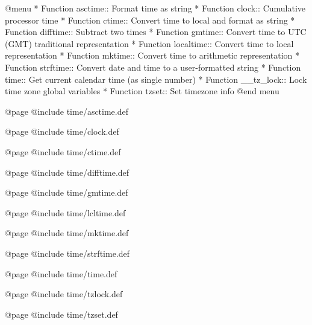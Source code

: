@menu
* Function asctime::     Format time as string
* Function clock::       Cumulative processor time
* Function ctime::       Convert time to local and format as string
* Function difftime::    Subtract two times
* Function gmtime::      Convert time to UTC (GMT) traditional representation
* Function localtime::   Convert time to local representation
* Function mktime::      Convert time to arithmetic representation
* Function strftime::    Convert date and time to a user-formatted string
* Function time::        Get current calendar time (as single number)
* Function __tz_lock::   Lock time zone global variables
* Function tzset::       Set timezone info
@end menu

@page
@include time/asctime.def

@page
@include time/clock.def

@page
@include time/ctime.def

@page
@include time/difftime.def

@page
@include time/gmtime.def

@page
@include time/lcltime.def

@page
@include time/mktime.def

@page
@include time/strftime.def

@page
@include time/time.def

@page
@include time/tzlock.def

@page
@include time/tzset.def
